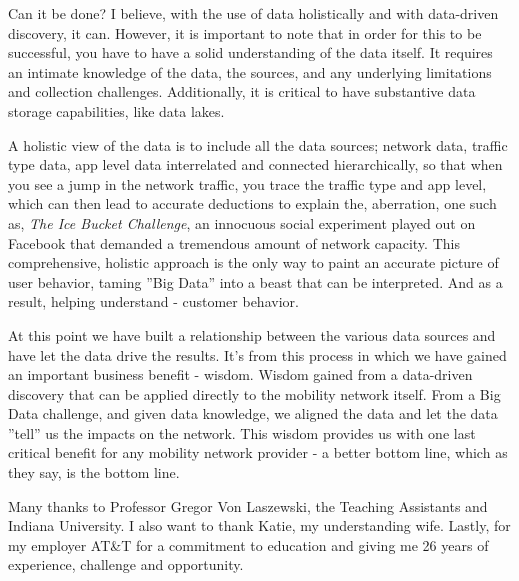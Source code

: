 \documentclass[sigconf]{acmart}
\begin{document}
Can it be done?   I believe, with the use of data holistically and with data-driven discovery, it can. However, it is important to note that in order for this to be successful, you have to have a solid understanding of the data itself.  It requires an intimate knowledge of the data, the sources, and any underlying limitations and collection challenges.  Additionally, it is critical to have substantive data storage capabilities, like data lakes. 

A holistic view of the data is to include all the data sources; network data, traffic type data, app level data interrelated and connected hierarchically, so that when you see a jump in the network traffic, you trace the traffic type and app level, which can then lead to accurate deductions to explain the, aberration, one such as, {\em The Ice Bucket Challenge}, an innocuous social experiment played out on Facebook that demanded a tremendous amount of network capacity.  This comprehensive, holistic approach is the only way to paint an accurate picture of user behavior, taming ''Big Data'' into a beast that can be interpreted.  And as a result, helping understand - customer behavior.  

At this point we have built a relationship between the various data sources and have let the data drive the results.  It's from this process in which we have gained an important business benefit - wisdom.  Wisdom gained from a data-driven discovery that can be applied directly to the mobility network itself. From a Big Data challenge, and given data knowledge, we aligned the data and let the data ''tell'' us the impacts on the network.  This wisdom provides us with one last critical benefit for any mobility network provider - a better bottom line, which as they say, is the bottom line.

\begin{acks}

Many thanks to Professor Gregor Von Laszewski, the Teaching Assistants and Indiana University.  I also want to thank Katie, my understanding wife.  Lastly, for my employer AT\&T for a commitment to education and giving me 26 years of experience, challenge and opportunity.

\end{acks}




 
\end{document}
